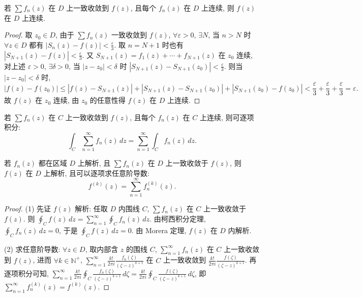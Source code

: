 \documentclass[theorem=false,mathfont=none,openany,sub3section]{easybook}
\begin{document}
\begin{theorem}
  若 $\sum f_{n}(z)$ 在 $D$ 上一致收敛到 $f(z)$, 且每个 $f_{n}(z)$ 在 $D$ 上连续, 则 $f(z)$ 在 $D$ 上连续.
\end{theorem}

\begin{proof}
  取 $z_{0}\in D$, 由于 $\sum f_{n}(z)$ 一致收敛到 $f(z)$, $\forall\varepsilon>0$, $\exists N$, 当 $n>N$ 时 $\forall z\in D$ 都有 $|S_{n}(z)-f(z)|<\frac{\varepsilon}{3}$. 取 $n=N+1$ 时也有 $|S_{N+1}(z)-f(z)|<\frac{\varepsilon}{3}$.
  又 $S_{N+1}(z)=f_{1}(z)+\cdots+f_{N+1}(z)$ 在 $z_{0}$ 连续, 对上述 $\varepsilon>0$, $\exists\delta>0$, 当 $|z-z_{0}|<\delta$ 时 $|S_{N+1}(z)-S_{N+1}(z_{0})|<\frac{\varepsilon}{3}$.
  则当 $|z-z_{0}|<\delta$ 时,
  \[
  |f(z)-f(z_{0})|\leq|f(z)-S_{N+1}(z)|+|S_{N+1}(z)-S_{N+1}(z_{0})|+|S_{N+1}(z_{0})-f(z_{0})|
  <\frac{\varepsilon}{3}+\frac{\varepsilon}{3}+\frac{\varepsilon}{3}=\varepsilon.
  \]
  故 $f(z)$ 在 $z_{0}$ 连续, 由 $z_{0}$ 的任意性得 $f(z)$ 在 $D$ 上连续.
\end{proof}

\begin{theorem}
  若 $\sum f_{n}(z)$ 在 $C$ 上一致收敛到 $f(z)$, 且每个 $f_{n}(z)$ 在 $C$ 上连续, 则可逐项积分:
  \[
  \int_{C}\sum_{n=1}^{\infty}f_{n}(z)\,dz=\sum_{n=1}^{\infty}\int_{C}f_{n}(z)\,dz.
  \]
\end{theorem}

\begin{theorem}
  若 $f_{n}(z)$ 都在区域 $D$ 上解析, 且 $\sum f_{n}(z)$ 在 $D$ 上一致收敛于 $f(z)$, 则 $f(z)$ 在 $D$ 上解析, 且可以逐项求任意阶导数:
  \[
  f^{(k)}(z)=\sum_{n=1}^{\infty}f_{n}^{(k)}(z).
  \]
\end{theorem}

\begin{proof}
  (1) 先证 $f(z)$ 解析: 任取 $D$ 内围线 $C$, $\sum f_{n}(z)$ 在 $C$ 上一致收敛于 $f(z)$. 则 $\oint_{C}f(z)\,dz=\sum_{n=1}^{\infty}\oint_{C}f_{n}(z)\,dz$. 由柯西积分定理, $\oint_{C}f_{n}(z)\,dz=0$, 于是 $\oint_{C}f(z)\,dz=0$. 由 Morera 定理, $f(z)$ 在 $D$ 内解析.

  (2) 求任意阶导数: $\forall z\in D$, 取内部含 $z$ 的围线 $C$, $\sum_{n=1}^{\infty}f_{n}(z)$ 在 $C$ 上一致收敛到 $f(z)$, 进而 $\forall k\in\mathbb{N}^{+}$, $\sum_{n=1}^{\infty}\frac{k!}{2\pi i}\frac{f_{n}(\zeta)}{(\zeta-z)^{k+1}}$ 在 $C$ 上一致收敛到 $\frac{k!}{2\pi i}\frac{f(\zeta)}{(\zeta-z)^{k+1}}$. 再逐项积分可知, $\sum_{n=1}^{\infty}\frac{k!}{2\pi i}\oint_{C}\frac{f_{n}(\zeta)}{(\zeta-z)^{k+1}}\,d\zeta=\frac{k!}{2\pi i}\oint_{C}\frac{f(\zeta)}{(\zeta-z)^{k+1}}\,d\zeta$, 即 $\sum_{n=1}^{\infty}f_{n}^{(k)}(z)=f^{(k)}(z)$.
\end{proof}
\end{document}
